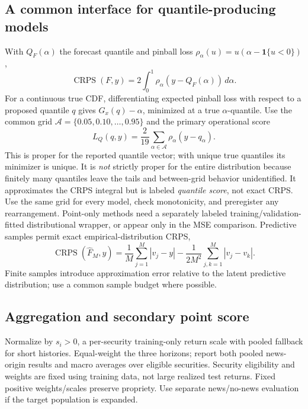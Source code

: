 \documentclass[11pt,letterpaper]{article}
\newcommand{\CRPS}{\operatorname{CRPS}}
\begin{document}
\subsection{A common interface for quantile-producing models}
With $Q_F(\alpha)$ the forecast quantile and pinball loss $\rho_\alpha(u)=u(\alpha-\mathbf{1}\{u<0\})$,
\begin{equation}
\CRPS(F,y)=2\int_0^1\rho_\alpha(y-Q_F(\alpha))\,d\alpha.
\end{equation}
For a continuous true CDF, differentiating expected pinball loss with respect to a proposed quantile $q$ gives $G_x(q)-\alpha$, minimized at a true $\alpha$-quantile. Use the common grid $\mathcal A=\{0.05,0.10,\ldots,0.95\}$ and the primary operational score
\begin{equation}
L_Q(q,y)=\frac{2}{19}\sum_{\alpha\in\mathcal A}\rho_\alpha(y-q_\alpha).
\label{eq:quantile}
\end{equation}
This is proper for the reported quantile vector; with unique true quantiles its minimizer is unique. It is \emph{not} strictly proper for the entire distribution because finitely many quantiles leave the tails and between-grid behavior unidentified. It approximates the CRPS integral but is labeled \emph{quantile score}, not exact CRPS. Use the same grid for every model, check monotonicity, and preregister any rearrangement. Point-only methods need a separately labeled training/validation-fitted distributional wrapper, or appear only in the MSE comparison. Predictive samples permit exact empirical-distribution CRPS,
\begin{equation}
\CRPS(\widehat F_M,y)=\frac1M\sum_{j=1}^M|v_j-y|
-\frac{1}{2M^2}\sum_{j,k=1}^M|v_j-v_k|.
\end{equation}
Finite samples introduce approximation error relative to the latent predictive distribution; use a common sample budget where possible.

\subsection{Aggregation and secondary point score}
Normalize by $s_i>0$, a per-security training-only return scale with pooled fallback for short histories. Equal-weight the three horizons; report both pooled news-origin results and macro averages over eligible securities. Security eligibility and weights are fixed using training data, not large realized test returns. Fixed positive weights/scales preserve propriety. Use separate news/no-news evaluation if the target population is expanded.
\end{document}
